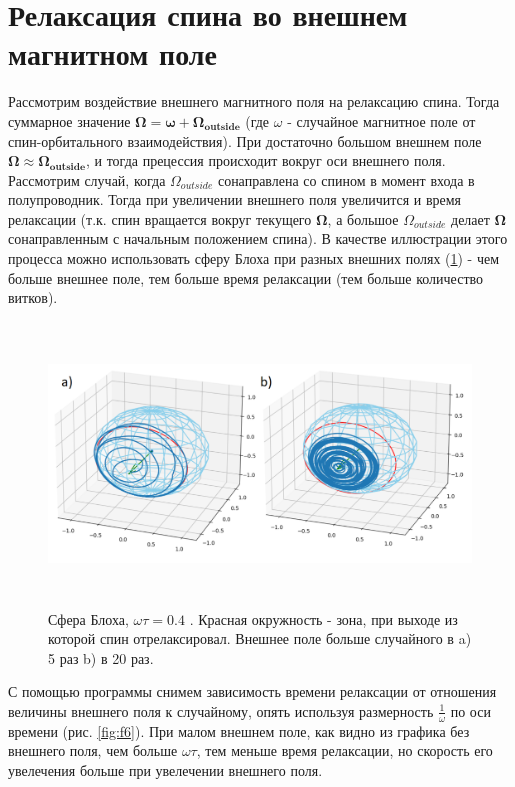 \documentclass[12pt,oneside]{book}
\begin{document}
{{\section{Релаксация спина во внешнем магнитном поле}
	Рассмотрим воздействие внешнего магнитного поля на релаксацию спина. Тогда суммарное значение $\bm{\Omega} = \bm{\omega} + \bm{{\Omega}_{outside}}$ (где ${\omega}$ - случайное магнитное поле от спин-орбитального взаимодействия). При достаточно большом внешнем поле  $\bm{\Omega} \approx \bm{{\Omega}_{outside}}$, и тогда прецессия происходит вокруг оси внешнего поля.
	Рассмотрим случай, когда ${\Omega}_{outside}$ сонаправлена со спином в момент входа в полупроводник. Тогда при увеличении внешнего поля увеличится и время релаксации (т.к. спин вращается вокруг текущего $\bm{\Omega}$, а большое ${\Omega}_{outside}$  делает $\bm{\Omega}$ сонаправленным с начальным положением спина).
	\newline
	В качестве иллюстрации этого процесса можно использовать сферу Блоха при разных внешних полях (\ref{fig:f5}) - чем больше внешнее поле, тем больше время релаксации (тем больше количество витков).
	\begin{figure}[h!]
		\centering
		\includegraphics[width = 16cm, height = 7.49cm]{img/Bloch_Sphere_0,4.png}
		\caption{Сфера Блоха, ${\omega}{\tau} = 0.4$ . Красная окружность - зона, при выходе из которой спин отрелаксировал. Внешнее поле больше случайного в a) 5 раз b) в 20 раз. }
		\label{fig:f5}
	\end{figure}
	С помощью программы снимем зависимость времени релаксации от отношения величины внешнего поля к случайному, опять используя размерность $\frac{1}{\omega}$ по оси времени (рис. \ref{fig:f6}). При малом внешнем поле, как видно из графика без внешнего поля, чем больше ${\omega}{\tau}$, тем меньше время релаксации, но скорость его увелечения больше при увелечении внешнего поля.
}}
\end{document}
